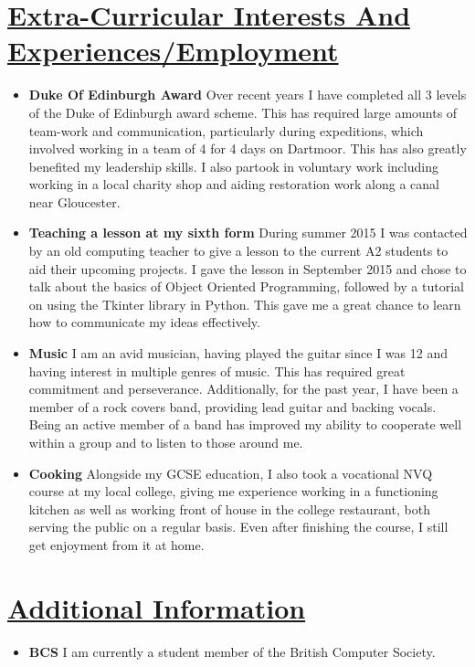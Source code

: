\documentclass[11pt]{article}
\begin{document}
	\vspace{-20pt}
	\hspace{-100pt}\section*{\underline{Extra-Curricular Interests And Experiences/Employment}}
			\begin{itemize}
				\item \textbf{Duke Of Edinburgh Award} Over recent years I have completed all 3 levels of the Duke of Edinburgh award scheme. This has required large amounts of team-work and communication, particularly during expeditions, which involved working in a team of 4 for 4 days on Dartmoor. This has also greatly benefited my leadership skills. I also partook in voluntary work including working in a local charity shop and aiding restoration work along a canal near Gloucester.
				\item \textbf{Teaching a lesson at my sixth form} During summer 2015 I was contacted by an old computing teacher to give a lesson to the current A2 students to aid their upcoming projects. I gave the lesson in September 2015 and chose to talk about the basics of Object Oriented Programming, followed by a tutorial on using the Tkinter library in Python. This gave me a great chance to learn how to communicate my ideas effectively. 
				\item \textbf{Music} I am an avid musician, having played the guitar since I was 12 and having interest in multiple genres of music. This has required great commitment and perseverance. Additionally, for the past year, I have been a member of a rock covers band, providing lead guitar and backing vocals. Being an active member of a band has improved my ability to cooperate well within a group and to listen to those around me. 
				\item \textbf{Cooking} Alongside my GCSE education, I also took a vocational NVQ course at my local college, giving me experience working in a functioning kitchen as well as working front of house in the college restaurant, both serving the public on a regular basis. Even after finishing the course, I still get enjoyment from it at home.
			\end{itemize}

	\vspace{-20pt}
	\hspace{-100pt}\section*{\underline{Additional Information}}
		\begin{itemize}
			\item \textbf{BCS} I am currently a student member of the British Computer Society.
		\end{itemize}
\end{document}

